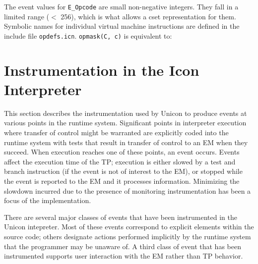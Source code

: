 The event values for {\tt E\_Opcode} are small non-negative integers.  They
fall in a limited range ($<$ 256), which is what allows a cset
representation for them.  Symbolic names for individual virtual machine
instructions are defined in the include file {\tt opdefs.icn}.
{\tt opmask(C, c)} is equivalent to:

{}
\vspace{-1.5pc}

\section{Instrumentation in the Icon Interpreter}

This section describes the instrumentation used by Unicon to produce
events at various points in the runtime system.  Significant points in
interpreter execution where transfer of control might be warranted are
explicitly coded into the runtime system with tests that result in
transfer of control to an EM when they succeed.  When execution reaches
one of these points, an event occurs.  Events affect the execution
time of the TP; execution is either slowed by a test and branch
instruction (if the event is not of interest to the EM), or stopped
while the event is reported to the EM and it processes information.
Minimizing the slowdown incurred due to the presence of monitoring
instrumentation has been a focus of the implementation.

There are several major classes of events that have been instrumented
in the Unicon intepreter.  Most of these events correspond to explicit
elements within the source code; others designate actions performed
implicitly by the runtime system that the programmer may be unaware of.
A third class of event that has been instrumented supports user
interaction with the EM rather than TP behavior.

\vspace{1pc}


